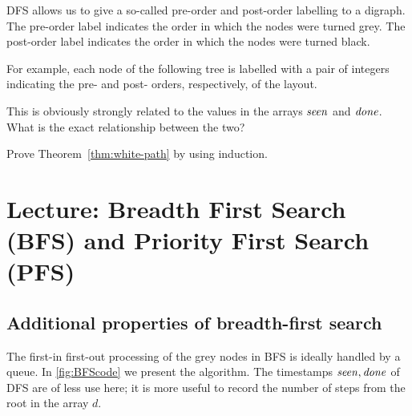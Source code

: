 \begin{Exercise}
\label{ex:DFS-prepostorder}
DFS allows us to give a so-called pre-order and post-order labelling to
a digraph. The pre-order label indicates the order in which the nodes
were turned grey. The post-order label indicates the order in which the
nodes were turned black.

For example, each node of the following tree is labelled with a pair of
integers indicating the pre- and post- orders, respectively, of the
layout.

\smallskip


This is obviously strongly related to the values in the arrays $\operatorname{\text{\textit{seen}}}$ and 
$\operatorname{\text{\textit{done}}}$. What is the exact relationship between the two?
\end{Exercise}

\begin{Exercise}\label{ex:white-path}
Prove Theorem~\ref{thm:white-path} by using induction.
\end{Exercise}


\chapter{Lecture: Breadth First Search (BFS) and Priority First Search (PFS)}

\section{Additional properties of breadth-first search}
\label{sec:bfs}

The first-in first-out processing of the grey nodes in BFS is ideally
handled by a queue. In \cref{fig:BFScode} we present the algorithm.
The timestamps $\operatorname{\text{\textit{seen}}}, \operatorname{\text{\textit{done}}}$ of DFS are of less use here;
it is more useful to record the number of steps from the root in the
array $d$.

